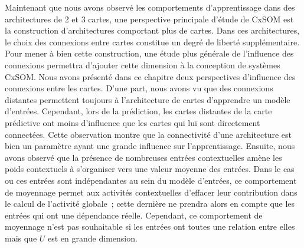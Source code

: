 \documentclass[../main]{subfiles}
\begin{document}
Maintenant que nous avons observé les comportements d'apprentissage dans des architectures de 2 et 3 cartes, une perspective principale d'étude de CxSOM est la construction d'architectures comportant plus de cartes.
Dans ces architectures, le choix des connexions entre cartes constitue un degré de liberté supplémentaire.
Pour mener à bien cette construction, une étude plus générale de l'influence des connexions permettra d'ajouter cette dimension à la conception de systèmes CxSOM.
Nous avons présenté dans ce chapitre deux perspectives d'influence des connexions entre les cartes.
D'une part, nous avons vu que des connexions distantes permettent toujours à l'architecture de cartes d'apprendre un modèle d'entrées. Cependant, lors de la prédiction, les cartes distantes de la carte prédictive ont moins d'influence que les cartes qui lui sont directement connectées. Cette observation montre que la connectivité d'une architecture est bien un paramètre ayant une grande influence sur l'apprentissage. 
Ensuite, nous avons observé que la présence de nombreuses entrées contextuelles amène les poids contextuels à s'organiser vers une valeur moyenne des entrées. Dans le cas ou ces entrées sont indépendantes au sein du modèle d'entrées, ce comportement de moyennage permet aux activités contextuelles d'effacer leur contribution dans le calcul de l'activité globale~; cette dernière ne prendra alors en compte que les entrées qui ont une dépendance réelle. Cependant, ce comportement de moyennage n'est pas souhaitable si les entrées ont toutes une relation entre elles mais que $U$ est en grande dimension.
\end{document}
